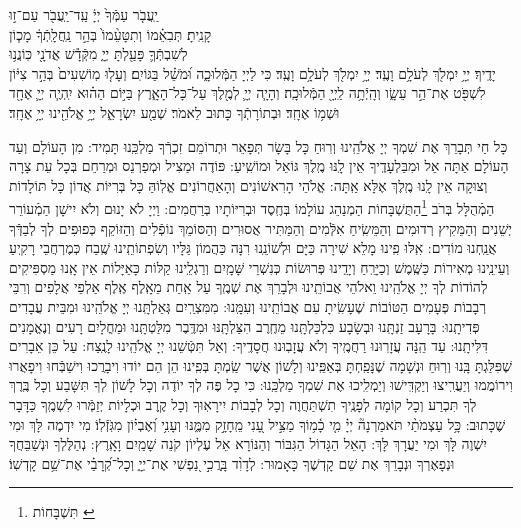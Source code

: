 \documentclass[twoside, openany, parskip=half, 11pt]{book}
\begin{document}
יַֽעֲבֹ֤ר עַמְּֿךָ֙ יְיָ֔ \hfill עַֽד־יַֽעֲבֹ֖ר עַם־ז֣וּ \\
קָנִֽיתָ׃ \hfill תְּבִאֵ֗מוֹ וְתִטָּעֵ֨מוֹ֙ בְּהַ֣ר נַֽחֲלָֽתְֿךָ֔ \hfill מָכ֧וֹן \\
לְשִׁבְתְּֿךָ֛ פָּעַ֖לְתָּ יְיָ֑ \hfill מִקְּֿדָ֕שׁ אֲדֹנָ֖י כּֽוֹנֲנ֥וּ \\
יָדֶֽיךָ׃ \hfill יְיָ֥ יִמְלֹ֖ךְ לְעֹלָ֥ם וָעֶֽד׃\hfill \break
יְיָ֥ יִמְלֹ֖ךְ לְעֹלָ֥ם וָעֶֽד׃
כִּי לַיְיָ הַמְּֿלוּכָ֑ה וּ֝מֹשֵׁ֗ל בַּגּוֹיִֽם׃
וְעָל֤וּ מֽוֹשִׁעִים֙ בְּהַ֣ר צִיּ֔וֹן לִשְׁפֹּ֖ט אֶת־הַ֣ר עֵשָׂ֑ו וְהָֽיְֿתָ֥ה לַֽיְיָ֖ הַמְּֿלוּכָֽה׃
וְהָיָ֧ה יְיָ֛ לְמֶ֖לֶךְ עַל־כָּל־הָאָ֑רֶץ בַּיּ֣וֹם הַה֗וּא יִֽהְיֶ֧ה יְיָ֛ אֶחָ֖ד וּשְׁמ֥וֹ אֶחָֽד׃
 וּבְתוֹרָתְֿךָ כָּתוּב לֵאמֹר׃
שְׁמַ֖ע יִשְׂרָאֵ֑ל יְיָ֥ אֱלֹהֵ֖ינוּ יְיָ֥ אֶחָֽד׃

\enlargethispage{.5\baselineskip} 
\label{nishmas}
 כָּל חַי תְּבָרֵךְ אֶת שִׁמְךָ יְיָ אֱלֹהֵֽינוּ וְרֽוּחַ כָּל בָּשָׂר תְּפָאֵר וּתְרוֹמֵם זִכְרְֿךָ מַלְכֵּֽנוּ תָּמִיד: מִן הָעוֹלָם וְעַד הָעוֹלָם אַתָּה אֵל וּמִבַּלְעָדֶֽיךָ אֵין לָֽנּוּ מֶֽלֶךְ גּוֹאֵל וּמוֹשִֽׁיעַ: 
פּוֹדֶה וּמַצִיל וּמְפַרְנֵס וּמְרַחֵם בְּכָל עֵת צָרָה וְצוּקָה אֵין לָֽנוּ מֶֽלֶךְ אֶלָּא אַֽתָּה: אֱלֹהֵי הָרִאשׁוֹנִים וְהָאַחֲרוֹנִים אֱלֽוֹהַּ כָּל בְּרִיּוֹת אֲדוֹן כָּל תּוֹלָדוֹת הַמְֿהֻלָּל בְּרֹב  \footnote{תִּשְׁבָּחוֹת \label{xx}}הַתֻּשְׁבָּחוֹת הַמְנַהֵג עוֹלָמוֹ בְּחֶֽסֶד וּבְרִיּוֹתָיו בְּרַחֲמִים: וַיְיָ לֹא יָנוּם וְלֹא יִישָׁן הַמְֿעוֹרֵר יְשֵׁנִים וְהַמֵּקִיץ רְדוּמִים וְהַמֵּשִֽׂיחַ אִלְּֿמִים וְהַמַּתִּיר אֲסוּרִים וְהַסּוֹמֵךְ נוֹפְֿלִים וְהַזּוֹקֵף כְּפוּפִים לְךָ לְבַדְּֿךָ אֲנַֽחְנוּ מוֹדִים: אִֽלּוּ פִֽינוּ מָלֵא שִׁירָה כַּיָּם וּלְשׁוֹנֵֽנוּ רִנָּה כַּהֲמוֹן גַּלָּיו וְשִׂפְתוֹתֵֽינוּ שֶֽׁבַח כְּמֶרְחֲבֵי רָקִֽיעַ וְעֵינֵֽינוּ מְאִירוֹת כַּשֶּֽׁמֶשׁ וְכַיָּרֵֽחַ וְיָדֵֽינוּ פְּרוּשׂוֹת כְּנִשְׁרֵי שָּׁמָֽיִם וְרַגְלֵֽינוּ קַלּוֹת כָּאַיָּלוֹת אֵין אָֽנוּ מַסְפִּיקִים לְהוֹדוֹת לְךָ יְיָ אֱלֹהֵֽינוּ וֵאלֹהֵי אֲבוֹתֵֽינוּ וּלְבָרֵךְ אֶת שְׁמֶֽךָ עַל אַֽחַת מֵאָֽלֶף אֶֽלֶף אַלְפֵי אֲלָפִים וְרִבֵּי רְבָבוֹת פְּעָמִים הַטּוֹבוֹת שֶׁעָשִֽׂיתָ עִם אֲבוֹתֵֽינוּ וְעִמָּֽנוּ: מִמִּצְרַֽיִם גְּאַלְתָּֽנוּ יְיָ אֱלֹהֵֽינוּ וּמִבֵּית עֲבָדִים פְּדִיתָֽנוּ: בָּרָעָב זַנְתָּֽנוּ וּבְשָׂבָע כִּלְכַּלְתָּֽנוּ מֵחֶֽרֶב הִצַּלְתָּֽנּוּ וּמִדֶּֽבֶר מִלַּטְתָּֽנוּ וּמֵחֳלָיִם רָעִים וְנֶאֱמָנִים דִּלִּיתָֽנוּ: עַד הֵֽנָּה עֲזָרֽוּנוּ רַחֲמֶֽיךָ וְלֹא עֲזָבֽוּנוּ חֲסָדֶֽיךָ: וְאַל תִּטְּֿשֵׁנוּ יְיָ אֱלֹהֵֽינוּ לָנֶֽצַח: עַל כֵּן אֵבָרִים שֶׁפִּלַּגְתָּ בָּֽנוּ וְרֽוּחַ וּנְשָׁמָה שֶׁנָּפַֽחְתָּ בְּאַפֵּֽינוּ וְלָשׁוֹן אֲשֶׁר שַֽׂמְתָּ בְּפִֽינוּ הֵן הֵם יוֹדוּ וִיבָרֲכוּ וִישַׁבְּֿחוּ וִיפָאֲרוּ וִירוֹמֲמוּ וְיַעֲרִֽיצוּ וְיַקְדִּֽישׁוּ וְיַמְלִֽיכוּ אֶת שִׁמְךָ מַלְכֵּֽנוּ: כִּי כָל פֶּה לְךָ יוֹדֶה וְכָל לָשׁוֹן לְךָ תִּשָּׁבַע וְכָל בֶּֽרֶךְ לְךָ תִּכְרַע וְכָל קוֹמָה לְפָנֶֽיךָ תִשְׁתַּחֲוֶה וְכָל לְבָבוֹת יִירָאֽוּךָ וְכָל קֶֽרֶב וּכְלָיוֹת יְזַמְּֿרוּ לִשְׁמֶֽךָ כַּדָּבָר שֶׁכָּתוּב:
 כָּ֥ל עַצְמֹתַ֨י תֹּאמַרְנָה֘ יְיָ֗ מִ֤י כָ֫מ֥וֹךָ מַצִּ֣יל עָ֭נִי מֵֽחָזָ֣ק מִמֶּ֑נּוּ וְעָנִ֥י וְ֝אֶבְי֗וֹן מִגֹּֽזְֿלֽוֹ׃ מִי יִדְמֶה לָּךְ וּמִי יִשְׁוֶה לָּךְ וּמִי יַעֲרָךְ לָּךְ: הָאֵל הַגָּדוֹל הַגִּבּוֹר וְהַנּוֹרָא אֵל עֶלְיוֹן קֹנֵה שָׁמַֽיִם וָאָֽרֶץ:
  נְהַלֶּלְךָ וּנְשַׁבֵּחֲךָ וּנְפָאֶרְךָ וּנְבָרֵךְ אֶת שֵׁם קָדְשֶׁךָ כָּאָמוּר:
לְדָוִ֨ד בָּֽרֲכִ֣י נַ֭פְשִׁי אֶת־יְיָ֑ וְכָל־קְ֝רָבַ֗י אֶת־שֵׁ֥ם קָדְשֽׁוֹ׃
 
\end{document}
